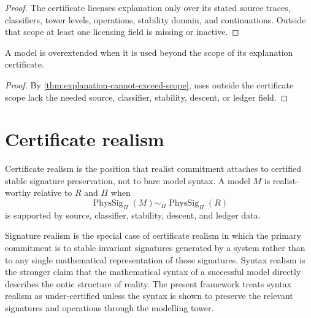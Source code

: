 \begin{proof}
The certificate licenses explanation only over its stated source traces, classifiers, tower levels, operations, stability domain, and continuations. Outside that scope at least one licensing field is missing or inactive.
\end{proof}

\begin{corollary}
\label{cor:overextension-certificate-failure}
A model is overextended when it is used beyond the scope of its explanation certificate.
\end{corollary}

\begin{proof}
By \autoref{thm:explanation-cannot-exceed-scope}, uses outside the certificate scope lack the needed source, classifier, stability, descent, or ledger field.
\end{proof}

\section{Certificate realism}
\label{sec:certificate-realism}

\begin{definition}
\label{def:certificate-realism}
Certificate realism is the position that realist commitment attaches to certified stable signature preservation, not to bare model syntax. A model $M$ is realist-worthy relative to $R$ and $\Pi$ when
$$
\operatorname{PhysSig}_{\Pi}(M)
\sim_{\Pi}
\operatorname{PhysSig}_{\Pi}(R)
$$
is supported by source, classifier, stability, descent, and ledger data.
\end{definition}

\begin{definition}
\label{def:signature-realism-syntax-realism}
Signature realism is the special case of certificate realism in which the primary commitment is to stable invariant signatures generated by a system rather than to any single mathematical representation of those signatures. Syntax realism is the stronger claim that the mathematical syntax of a successful model directly describes the ontic structure of reality. The present framework treats syntax realism as under-certified unless the syntax is shown to preserve the relevant signatures and operations through the modelling tower.
\end{definition}

